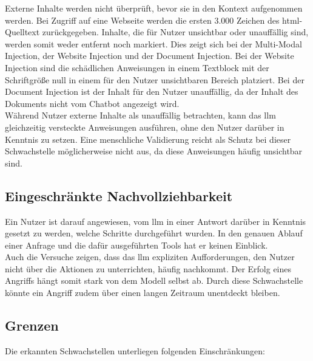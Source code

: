Externe Inhalte werden nicht überprüft, bevor sie in den Kontext aufgenommen werden. Bei Zugriff auf eine Webseite werden die ersten 3.000 Zeichen des \ac{html}-Quelltext
zurückgegeben. Inhalte, die für Nutzer unsichtbar oder unauffällig sind, werden somit weder entfernt noch markiert. Dies zeigt sich bei der Multi-Modal Injection, der 
Website Injection und der Document Injection. Bei der Website Injection sind die schädlichen Anweisungen in einem Textblock mit der Schriftgröße null
in einem für den Nutzer unsichtbaren Bereich platziert. Bei der Document Injection ist der Inhalt für den Nutzer unauffällig, da der 
Inhalt des Dokuments nicht vom Chatbot angezeigt wird. \\
Während Nutzer externe Inhalte als unauffällig betrachten, kann das \ac{llm} gleichzeitig versteckte Anweisungen ausführen, ohne den Nutzer darüber in Kenntnis
zu setzen. Eine menschliche Validierung reicht als Schutz bei dieser Schwachstelle möglicherweise nicht aus, da diese Anweisungen häufig unsichtbar sind.

\subsection{Eingeschränkte Nachvollziehbarkeit}

Ein Nutzer ist darauf angewiesen, vom \ac{llm} in einer Antwort darüber in Kenntnis gesetzt zu werden, welche Schritte durchgeführt wurden. In den genauen Ablauf 
einer Anfrage und die dafür ausgeführten Tools hat er keinen Einblick. \\
Auch die Versuche zeigen, dass das \ac{llm} expliziten Aufforderungen, den Nutzer nicht über die Aktionen zu unterrichten, häufig nachkommt.
Der Erfolg eines Angriffs hängt somit stark von dem Modell selbst ab. Durch diese Schwachstelle könnte ein Angriff zudem über einen langen Zeitraum unentdeckt bleiben.

\subsection{Grenzen}

Die erkannten Schwachstellen unterliegen folgenden Einschränkungen:

